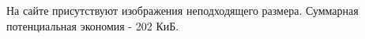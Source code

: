 \noindent
\begin{minipage}{\linewidth}
\end{minipage}
\bigskip

\noindent
\begin{minipage}{\linewidth}
\end{minipage}
\bigskip

На сайте присутствуют изображения неподходящего размера. Суммарная потенциальная экономия - 202 КиБ.

